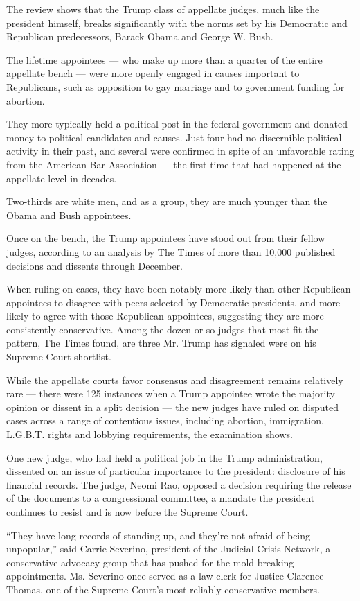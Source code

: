 The review shows that the Trump class of appellate judges, much like the
president himself, breaks significantly with the norms set by his
Democratic and Republican predecessors, Barack Obama and George W. Bush.

The lifetime appointees --- who make up more than a quarter of the
entire appellate bench --- were more openly engaged in causes important
to Republicans, such as opposition to gay marriage and to government
funding for abortion.

They more typically held a political post in the federal government and
donated money to political candidates and causes. Just four had no
discernible political activity in their past, and several were confirmed
in spite of an unfavorable rating from the American Bar Association ---
the first time that had happened at the appellate level in decades.

Two-thirds are white men, and as a group, they are much younger than the
Obama and Bush appointees.

Once on the bench, the Trump appointees have stood out from their fellow
judges, according to an analysis by The Times of more than 10,000
published decisions and dissents through December.

When ruling on cases, they have been notably more likely than other
Republican appointees to disagree with peers selected by Democratic
presidents, and more likely to agree with those Republican appointees,
suggesting they are more consistently conservative. Among the dozen or
so judges that most fit the pattern, The Times found, are three Mr.
Trump has signaled were on his Supreme Court shortlist.

While the appellate courts favor consensus and disagreement remains
relatively rare --- there were 125 instances when a Trump appointee
wrote the majority opinion or dissent in a split decision --- the new
judges have ruled on disputed cases across a range of contentious
issues, including abortion, immigration, L.G.B.T. rights and lobbying
requirements, the examination shows.

One new judge, who had held a political job in the Trump administration,
dissented on an issue of particular importance to the president:
disclosure of his financial records. The judge, Neomi Rao, opposed a
decision requiring the release of the documents to a congressional
committee, a mandate the president continues to resist and is now before
the Supreme Court.

``They have long records of standing up, and they're not afraid of being
unpopular,'' said Carrie Severino, president of the Judicial Crisis
Network, a conservative advocacy group that has pushed for the
mold-breaking appointments. Ms. Severino once served as a law clerk for
Justice Clarence Thomas, one of the Supreme Court's most reliably
conservative members.

